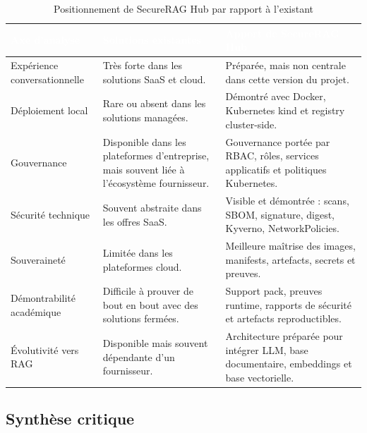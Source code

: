 \begin{table}[htbp]
\centering
\small
\renewcommand{\arraystretch}{1.3}
\setlength{\tabcolsep}{4pt}
\begin{tabularx}{\textwidth}{|p{3.8cm}|Y|Y|}
\hline
{}
\textcolor{white}{\textbf{Axe d’analyse}} &
\textcolor{white}{\textbf{Solutions existantes}} &
\textcolor{white}{\textbf{Apport de SecureRAG Hub}} \\
\hline

Expérience conversationnelle &
Très forte dans les solutions SaaS et cloud. &
Préparée, mais non centrale dans cette version du projet. \\
\hline

Déploiement local &
Rare ou absent dans les solutions managées. &
Démontré avec Docker, Kubernetes kind et registry cluster-side. \\
\hline

Gouvernance &
Disponible dans les plateformes d’entreprise, mais souvent liée à l’écosystème fournisseur. &
Gouvernance portée par RBAC, rôles, services applicatifs et politiques Kubernetes. \\
\hline

Sécurité technique &
Souvent abstraite dans les offres SaaS. &
Visible et démontrée : scans, SBOM, signature, digest, Kyverno, NetworkPolicies. \\
\hline

Souveraineté &
Limitée dans les plateformes cloud. &
Meilleure maîtrise des images, manifests, artefacts, secrets et preuves. \\
\hline

Démontrabilité académique &
Difficile à prouver de bout en bout avec des solutions fermées. &
Support pack, preuves runtime, rapports de sécurité et artefacts reproductibles. \\
\hline

Évolutivité vers RAG &
Disponible mais souvent dépendante d’un fournisseur. &
Architecture préparée pour intégrer LLM, base documentaire, embeddings et base vectorielle. \\
\hline

\end{tabularx}
\caption{Positionnement de SecureRAG Hub par rapport à l’existant}
\label{tab:positionnement_securerag}
\end{table}

\newpage
\subsection{Synthèse critique}

